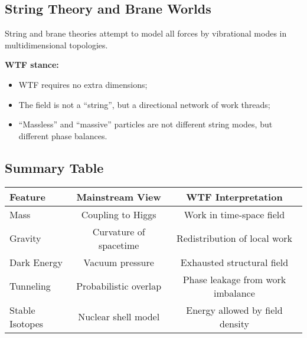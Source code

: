 \subsection{String Theory and Brane Worlds}

String and brane theories attempt to model all forces by vibrational modes in multidimensional topologies.

\textbf{WTF stance:}
\begin{itemize}
    \item WTF requires no extra dimensions;
    \item The field is not a “string”, but a directional network of work threads;
    \item “Massless” and “massive” particles are not different string modes, but different phase balances.
\end{itemize}

\subsection{Summary Table}

\begin{center}
\begin{tabular}{|l|c|c|}
\hline
\textbf{Feature} & \textbf{Mainstream View} & \textbf{WTF Interpretation} \\
\hline
Mass & Coupling to Higgs & Work in time-space field \\
Gravity & Curvature of spacetime & Redistribution of local work \\
Dark Energy & Vacuum pressure & Exhausted structural field \\
Tunneling & Probabilistic overlap & Phase leakage from work imbalance \\
Stable Isotopes & Nuclear shell model & Energy allowed by field density \\
\hline
\end{tabular}
\end{center}
